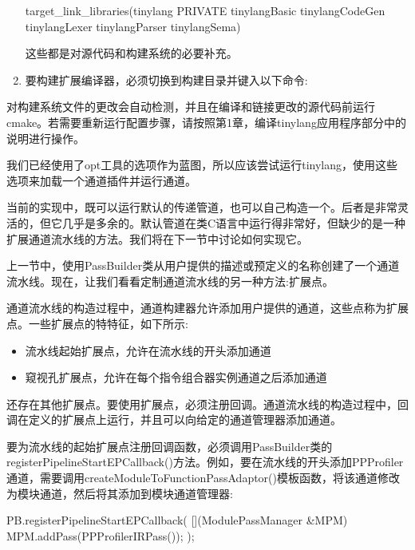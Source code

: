 \begin{enumerate}
\begin{cmake}
target_link_libraries(tinylang
    PRIVATE tinylangBasic tinylangCodeGen
    tinylangLexer tinylangParser tinylangSema)
\end{cmake}

这些都是对源代码和构建系统的必要补充。

\item
要构建扩展编译器，必须切换到构建目录并键入以下命令:


\end{enumerate}

对构建系统文件的更改会自动检测，并且在编译和链接更改的源代码前运行cmake。若需要重新运行配置步骤，请按照第1章，编译tinylang应用程序部分中的说明进行操作。

我们已经使用了opt工具的选项作为蓝图，所以应该尝试运行tinylang，使用这些选项来加载一个通道插件并运行通道。

当前的实现中，既可以运行默认的传递管道，也可以自己构造一个。后者是非常灵活的，但它几乎是多余的。默认管道在类C语言中运行得非常好，但缺少的是一种扩展通道流水线的方法。我们将在下一节中讨论如何实现它。


上一节中，使用PassBuilder类从用户提供的描述或预定义的名称创建了一个通道流水线。现在，让我们看看定制通道流水线的另一种方法:扩展点。

通道流水线的构造过程中，通道构建器允许添加用户提供的通道，这些点称为扩展点。一些扩展点的特特征，如下所示:

\begin{itemize}
\item
流水线起始扩展点，允许在流水线的开头添加通道

\item
窥视孔扩展点，允许在每个指令组合器实例通道之后添加通道
\end{itemize}

还存在其他扩展点。要使用扩展点，必须注册回调。通道流水线的构造过程中，回调在定义的扩展点上运行，并且可以向给定的通道管理器添加通道。

要为流水线的起始扩展点注册回调函数，必须调用PassBuilder类的registerPipelineStartEPCallback()方法。例如，要在流水线的开头添加PPProfiler通道，需要调用createModuleToFunctionPassAdaptor()模板函数，将该通道修改为模块通道，然后将其添加到模块通道管理器:

\begin{cpp}
PB.registerPipelineStartEPCallback(
    [](ModulePassManager &MPM) {
        MPM.addPass(PPProfilerIRPass());
    });
\end{cpp}

